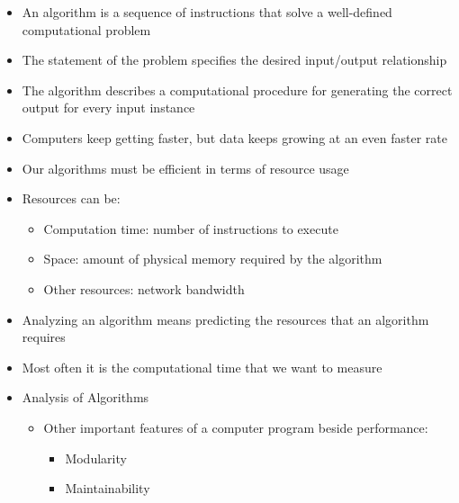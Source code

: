 \begin{itemize}

  \item An algorithm is a sequence of instructions that solve a well-defined computational problem

  \item The statement of the problem specifies the desired input/output relationship

  \item The algorithm describes a computational procedure for generating the correct output for every input instance

  \item Computers keep getting faster, but data keeps growing at an even faster rate

  \item Our algorithms must be efficient in terms of resource usage

  \item Resources can be:

    \begin{itemize}

      \item Computation time: number of instructions to execute

      \item Space: amount of physical memory required by the algorithm

      \item Other resources: network bandwidth

    \end{itemize}

  \item Analyzing an algorithm means predicting the resources that an algorithm requires

  \item Most often it  is the computational time that we want to measure

  \item Analysis of Algorithms

    \begin{itemize}

      \item Other important features of a computer program beside performance:

        \begin{itemize}

          \item Modularity

          \item Maintainability


\end{itemize}
\end{itemize}
\end{itemize}
